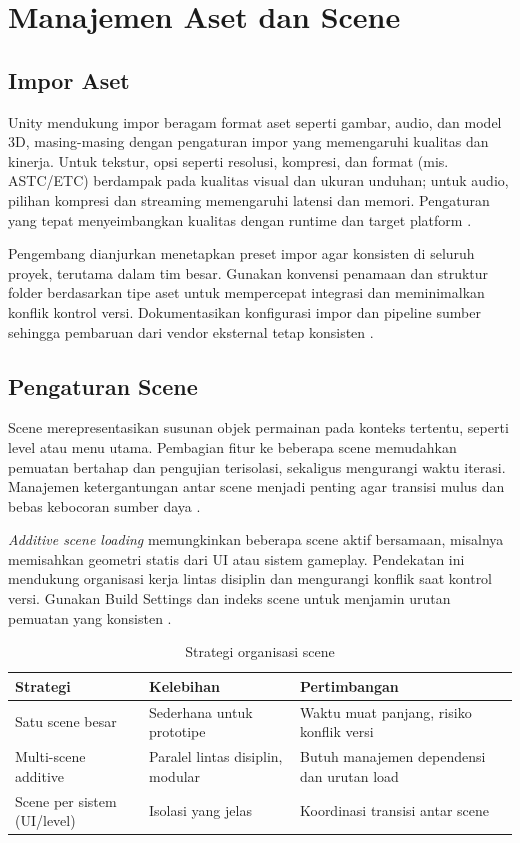 \documentclass[../main.tex]{subfiles}
\begin{document}
\chapter{Manajemen Aset dan Scene}

\section{Impor Aset}
Unity mendukung impor beragam format aset seperti gambar, audio, dan model 3D, masing-masing dengan pengaturan impor yang memengaruhi kualitas dan kinerja. Untuk tekstur, opsi seperti resolusi, kompresi, dan format (mis. ASTC/ETC) berdampak pada kualitas visual dan ukuran unduhan; untuk audio, pilihan kompresi dan streaming memengaruhi latensi dan memori. Pengaturan yang tepat menyeimbangkan kualitas dengan runtime dan target platform \parencite{unity-import-assets,unity-platform-texture}.

Pengembang dianjurkan menetapkan preset impor agar konsisten di seluruh proyek, terutama dalam tim besar. Gunakan konvensi penamaan dan struktur folder berdasarkan tipe aset untuk mempercepat integrasi dan meminimalkan konflik kontrol versi. Dokumentasikan konfigurasi impor dan pipeline sumber sehingga pembaruan dari vendor eksternal tetap konsisten \parencite{unity-project-structure,unity-import-assets}.

\section{Pengaturan Scene}
Scene merepresentasikan susunan objek permainan pada konteks tertentu, seperti level atau menu utama. Pembagian fitur ke beberapa scene memudahkan pemuatan bertahap dan pengujian terisolasi, sekaligus mengurangi waktu iterasi. Manajemen ketergantungan antar scene menjadi penting agar transisi mulus dan bebas kebocoran sumber daya \parencite{unity-scenes}.

\textit{Additive scene loading} memungkinkan beberapa scene aktif bersamaan, misalnya memisahkan geometri statis dari UI atau sistem gameplay. Pendekatan ini mendukung organisasi kerja lintas disiplin dan mengurangi konflik saat kontrol versi. Gunakan Build Settings dan indeks scene untuk menjamin urutan pemuatan yang konsisten \parencite{unity-scenes}.

\begin{table}[h]
  \centering
  \caption{Strategi organisasi scene}
  \begin{tabularx}{\textwidth}{@{}lXX@{}}
    \toprule
    Strategi & Kelebihan & Pertimbangan \\
    \midrule
    Satu scene besar & Sederhana untuk prototipe & Waktu muat panjang, risiko konflik versi \\
    Multi-scene additive & Paralel lintas disiplin, modular & Butuh manajemen dependensi dan urutan load \\
    Scene per sistem (UI/level) & Isolasi yang jelas & Koordinasi transisi antar scene \\
    \bottomrule
  \end{tabularx}
\end{table}
\end{document}
